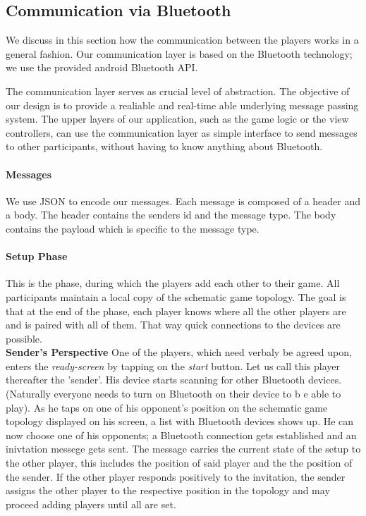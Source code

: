 \documentclass{report}
\begin{document}
\subsection{Communication via Bluetooth} We discuss in this section how the communication between the players works in a general fashion. Our communication layer is based on the Bluetooth technology; we use the provided android Bluetooth API. 

The communication layer serves as crucial level of abstraction. The objective of our design is to provide a realiable and real-time able underlying message passing system. The upper layers of our application, such as the game logic or the view controllers, can use the communication layer as simple interface to send messages to other participants, without having to know anything about Bluetooth.

\paragraph{Messages}
We use JSON to encode our messages. Each message is composed of a header and a body. The header contains the senders id and the message type. The body contains the payload which is specific to the message type.

\paragraph{Setup Phase}
This is the phase, during which the players add each other to their game. All participants maintain a local copy of the schematic game topology. The goal is that at the end of the phase, each player knows where all the other players are and is paired with all of them. That way quick connections to the devices are possible.\\

\textbf{Sender's Perspective} One of the players, which need verbaly be agreed upon, enters the \textit{ready-screen} by tapping on the \textit{start} button. Let us call this player thereafter the 'sender'. His device starts scanning for other Bluetooth devices. (Naturally everyone needs to turn on Bluetooth on their device to b e able to play). As he taps on one of his opponent's position on the schematic game topology displayed on his screen, a list with Bluetooth devices shows up. He can now choose one of his opponents; a Bluetooth connection gets established and an inivtation messege gets sent. The message carries the current state of the setup to the other player, this includes the position of said player and the the position of the sender. If the other player responds positively to the invitation, the sender assigns the other player to the respective position in the topology and may proceed adding players until all are set.\\
\end{document}
